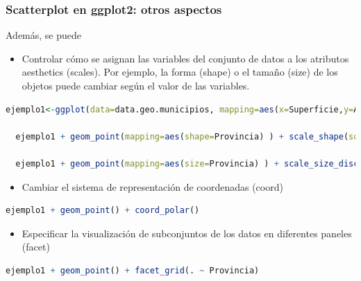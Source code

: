 \documentclass[8pt,ignorenonframetext,]{beamer}
\begin{document}
\begin{frame}[fragile]\frametitle{Scatterplot en ggplot2: otros
aspectos}

Además, se puede

\begin{itemize}
\itemsep1pt\parskip0pt
\item
  Controlar cómo se asignan las variables del conjunto de datos a los
  atributos aesthetics (scales). Por ejemplo, la forma (shape) o el
  tamaño (size) de los objetos puede cambiar según el valor de las
  variables.
\end{itemize}

\begin{lstlisting}[language=R]
  ejemplo1<-ggplot(data=data.geo.municipios, mapping=aes(x=Superficie,y=Altitud, colour=Isla))

  ejemplo1 + geom_point(mapping=aes(shape=Provincia) ) + scale_shape(solid = FALSE)  # cambiar la forma
  
  ejemplo1 + geom_point(mapping=aes(size=Provincia) ) + scale_size_discrete(range = c(2, 4) ) # cambiar el tamaño
\end{lstlisting}

\begin{itemize}
\itemsep1pt\parskip0pt
\item
  Cambiar el sistema de representación de coordenadas (coord)
\end{itemize}

\begin{lstlisting}[language=R]
  ejemplo1 + geom_point() + coord_polar()
\end{lstlisting}

\begin{itemize}
\itemsep1pt\parskip0pt
\item
  Especificar la visualización de subconjuntos de los datos en
  diferentes paneles (facet)
\end{itemize}

\begin{lstlisting}[language=R]
  ejemplo1 + geom_point() + facet_grid(. ~ Provincia)
\end{lstlisting}

\end{frame}
\end{document}
